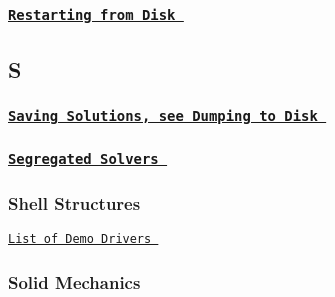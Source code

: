  \subsubsection*{ \href{ ../../unsteady_heat/two_d_unsteady_heat2/html/index.html }{\tt Restarting from Disk } }

 \subsection*{ S }

 \subsubsection*{ \href{ ../../index/html/index.html#D.DumpingtoDisk }{\tt Saving Solutions, see Dumping to Disk } }

\subsubsection*{ \href{ ../../interaction/fsi_channel_segregated_solver/html/index.html#overview }{\tt Segregated Solvers } }

\subsubsection*{ Shell Structures }

 
\begin{DoxyItemize}
\item  \href{ ../../example_code_list/html/index.html#shell }{\tt List of Demo Drivers }  
\end{DoxyItemize} \subsubsection*{ Solid Mechanics }

